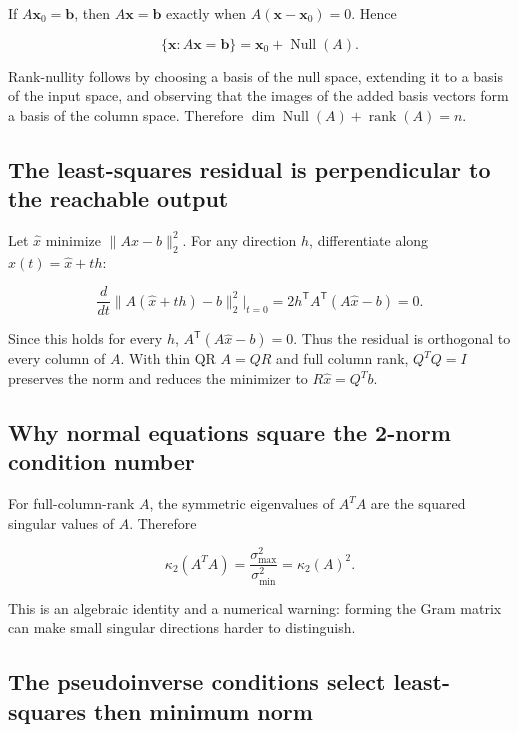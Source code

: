 If \(A\mathbf x_0=\mathbf b\), then \(A\mathbf x=\mathbf b\) exactly when \(A(\mathbf x-\mathbf x_0)=0\). Hence

\[
\{\mathbf x:A\mathbf x=\mathbf b\}=\mathbf x_0+\operatorname{Null}(A).
\]

Rank-nullity follows by choosing a basis of the null space, extending it to a basis of the input space, and observing that the images of the added basis vectors form a basis of the column space. Therefore \(\dim\operatorname{Null}(A)+\operatorname{rank}(A)=n\).

\subsection{The least-squares residual is perpendicular to the reachable output}\label{02-foundations-ii-ch039-the-least-squares-residual-is-perpendicular-to-the-reachable-output}

Let \(\widehat x\) minimize \(\|Ax-b\|_2^2\). For any direction \(h\), differentiate along \(x(t)=\widehat x+th\):

\[
\frac{d}{dt}\|A(\widehat x+th)-b\|_2^2\bigg|_{t=0}
=2h^\mathsf T A^\mathsf T(A\widehat x-b)=0.
\]

Since this holds for every \(h\), \(A^\mathsf T(A\widehat x-b)=0\). Thus the residual is orthogonal to every column of \(A\). With thin QR \(A=QR\) and full column rank, \(Q^TQ=I\) preserves the norm and reduces the minimizer to \(R\widehat x=Q^Tb\).

\subsection{Why normal equations square the 2-norm condition number}\label{02-foundations-ii-ch039-why-normal-equations-square-the-2-norm-condition-number}

For full-column-rank \(A\), the symmetric eigenvalues of \(A^TA\) are the squared singular values of \(A\). Therefore

\[
\kappa_2(A^TA)=\frac{\sigma_{\max}^2}{\sigma_{\min}^2}=\kappa_2(A)^2.
\]

This is an algebraic identity and a numerical warning: forming the Gram matrix can make small singular directions harder to distinguish.

\subsection{The pseudoinverse conditions select least-squares then minimum norm}\label{02-foundations-ii-ch039-the-pseudoinverse-conditions-select-least-squares-then-minimum-norm}

